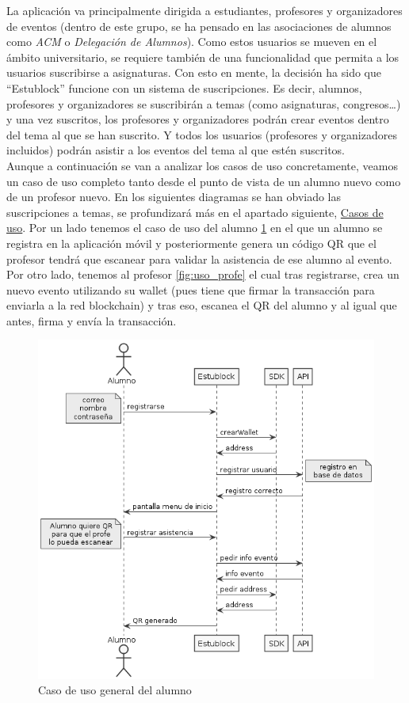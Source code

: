 La aplicación va principalmente dirigida a estudiantes, profesores y organizadores de eventos (dentro de este grupo, se ha pensado en las asociaciones de alumnos como \emph{ACM} o \emph{Delegación de Alumnos}). Como estos usuarios se mueven en el ámbito universitario, se requiere también de una funcionalidad que permita a los usuarios suscribirse a asignaturas. Con esto en mente, la decisión ha sido que ``Estublock'' funcione con un sistema de suscripciones. Es decir, alumnos, profesores y organizadores se suscribirán a temas (como asignaturas, congresos\dots) y una vez suscritos, los profesores y organizadores podrán crear eventos dentro del tema al que se han suscrito. Y todos los usuarios (profesores y organizadores incluidos) podrán asistir a los eventos del tema al que estén suscritos. \\

Aunque a continuación se van a analizar los casos de uso concretamente, veamos un caso de uso completo tanto desde el punto de vista de un alumno nuevo como de un profesor nuevo. En los siguientes diagramas se han obviado las suscripciones a temas, se profundizará más en el apartado siguiente, \hyperref[sec:casosUso]{Casos de uso}. Por un lado tenemos el caso de uso del alumno \ref{fig:uso_alumno} en el que un alumno se registra en la aplicación móvil y posteriormente genera un código QR que el profesor tendrá que escanear para validar la asistencia de ese alumno al evento. Por otro lado, tenemos al profesor \ref{fig:uso_profe} el cual tras registrarse, crea un nuevo evento utilizando su wallet (pues tiene que firmar la transacción para enviarla a la red blockchain) y tras eso, escanea el QR del alumno y al igual que antes, firma y envía la transacción. 

\begin{figure}[h!]
  \centering
  \includegraphics[width=0.8\linewidth]{figs/Desarrollo/CasosUso/generalAlumno}
  \caption[Caso de uso general del alumno]{Caso de uso general del alumno}
  \label{fig:uso_alumno}
\end{figure}

